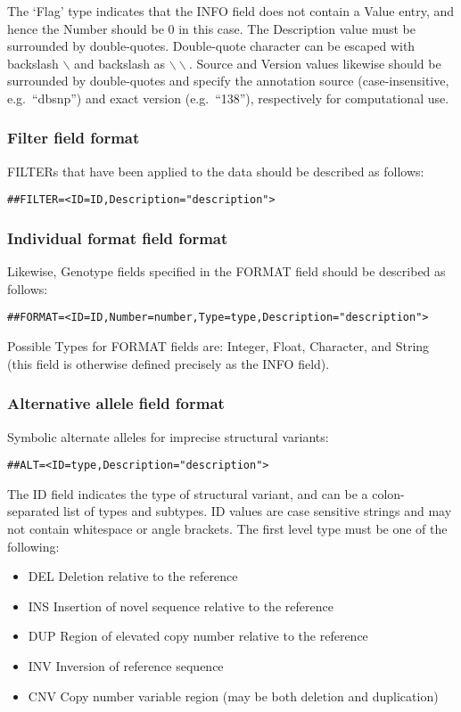 \documentclass[8pt]{article}
\begin{document}
The `Flag' type indicates that the INFO field does not contain a Value entry, and hence the Number should be $0$ in this case. The Description value must be surrounded by double-quotes. Double-quote character can be escaped with backslash $\backslash$ and backslash as $\backslash\backslash$. Source and Version values likewise should be surrounded by double-quotes and specify the annotation source (case-insensitive, e.g.\ ``dbsnp'') and exact version (e.g.\ ``138''), respectively for computational use.

\subsubsection{Filter field format}
FILTERs that have been applied to the data should be described as follows:

\begin{verbatim}
##FILTER=<ID=ID,Description="description">
\end{verbatim}

\subsubsection{Individual format field format}
Likewise, Genotype fields specified in the FORMAT field should be described as follows:

\begin{verbatim}
##FORMAT=<ID=ID,Number=number,Type=type,Description="description">
\end{verbatim}

Possible Types for FORMAT fields are: Integer, Float, Character, and String (this field is otherwise defined precisely as the INFO field).

\subsubsection{Alternative allele field format}
Symbolic alternate alleles for imprecise structural variants:

\begin{verbatim}
##ALT=<ID=type,Description="description">
\end{verbatim}
The ID field indicates the type of structural variant, and can be a colon-separated list of types and subtypes. ID values are case sensitive strings and may not contain whitespace or angle brackets. The first level type must be one of the following:
\begin{itemize}
  \item DEL Deletion relative to the reference
  \item INS Insertion of novel sequence relative to the reference
  \item DUP Region of elevated copy number relative to the reference
  \item INV Inversion of reference sequence
  \item CNV Copy number variable region (may be both deletion and duplication)
\end{itemize}
\end{document}
